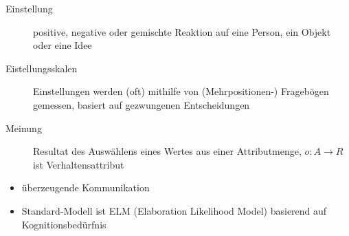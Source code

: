 \begin{description}
	\item[Einstellung] positive, negative oder gemischte Reaktion auf eine Person, ein Objekt oder eine Idee
	\item[Eistellungsskalen] Einstellungen werden (oft) mithilfe von (Mehrpositionen-) Fragebögen gemessen, basiert auf gezwungenen Entscheidungen
	\item[Meinung] Resultat des Auswählens eines Wertes aus einer Attributmenge, $o:A\rightarrow R$ ist Verhaltensattribut
\end{description}
\begin{itemize}
	\item überzeugende Kommunikation
	\item Standard-Modell ist ELM (Elaboration Likelihood Model) basierend auf Kognitionsbedürfnis
		\begin{center}
		\end{center}
\end{itemize}